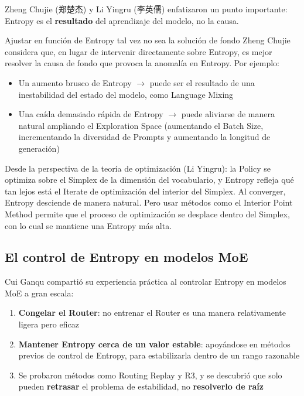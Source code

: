 Zheng Chujie (郑楚杰) y Li Yingru (李英儒) enfatizaron un punto importante: Entropy es el \textbf{resultado} del aprendizaje del modelo, no la causa.

\begin{knowledgebox}{Ajustar en función de Entropy tal vez no sea la solución de fondo}
Zheng Chujie considera que, en lugar de intervenir directamente sobre Entropy, es mejor resolver la causa de fondo que provoca la anomalía en Entropy. Por ejemplo:
\begin{itemize}
    \item Un aumento brusco de Entropy $\rightarrow$ puede ser el resultado de una inestabilidad del estado del modelo, como Language Mixing
    \item Una caída demasiado rápida de Entropy $\rightarrow$ puede aliviarse de manera natural ampliando el Exploration Space (aumentando el Batch Size, incrementando la diversidad de Prompts y aumentando la longitud de generación)
\end{itemize}
Desde la perspectiva de la teoría de optimización (Li Yingru): la Policy se optimiza sobre el Simplex de la dimensión del vocabulario, y Entropy refleja qué tan lejos está el Iterate de optimización del interior del Simplex. Al converger, Entropy desciende de manera natural. Pero usar métodos como el Interior Point Method permite que el proceso de optimización se desplace dentro del Simplex, con lo cual se mantiene una Entropy más alta.
\end{knowledgebox}

\subsection{El control de Entropy en modelos MoE}

Cui Ganqu compartió su experiencia práctica al controlar Entropy en modelos MoE a gran escala:

\begin{enumerate}
    \item \textbf{Congelar el Router}: no entrenar el Router es una manera relativamente ligera pero eficaz
    \item \textbf{Mantener Entropy cerca de un valor estable}: apoyándose en métodos previos de control de Entropy, para estabilizarla dentro de un rango razonable
    \item Se probaron métodos como Routing Replay y R3, y se descubrió que solo pueden \textbf{retrasar} el problema de estabilidad, no \textbf{resolverlo de raíz}
\end{enumerate}

